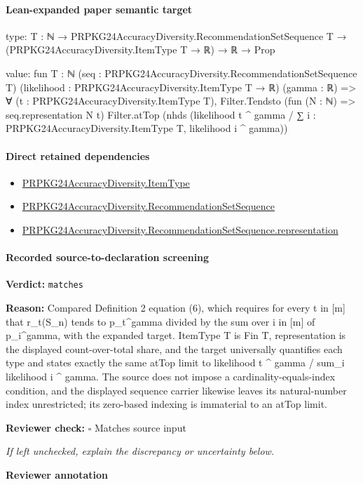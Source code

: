 \documentclass[10pt]{article}
\newcommand{\reviewerbox}{%
  \par\noindent\fbox{\parbox{0.96\linewidth}{\rule{0pt}{0.38in}}}\par
}
\newcommand{\reviewmatch}[1]{%
  \par\noindent\textbf{Reviewer check:} $\square$\; #1\par
  \noindent\emph{If left unchecked, explain the discrepancy or uncertainty below.}\par
}
\begin{document}
\paragraph{Lean-expanded paper semantic target}
\begin{ReviewVerbatim}
type:
{T : ℕ} → PRPKG24AccuracyDiversity.RecommendationSetSequence T → (PRPKG24AccuracyDiversity.ItemType T → ℝ) → ℝ → Prop

value:
fun {T : ℕ} (seq : PRPKG24AccuracyDiversity.RecommendationSetSequence T)
    (likelihood : PRPKG24AccuracyDiversity.ItemType T → ℝ) (gamma : ℝ) =>
  ∀ (t : PRPKG24AccuracyDiversity.ItemType T),
    Filter.Tendsto (fun (N : ℕ) => seq.representation N t) Filter.atTop
      (nhds (likelihood t ^ gamma / ∑ i : PRPKG24AccuracyDiversity.ItemType T, likelihood i ^ gamma))
\end{ReviewVerbatim}

\paragraph{Direct retained dependencies}
\begin{itemize}\raggedright
\item \hyperlink{governing-declaration-562ef32e180a12be}{PRPKG24\allowbreak{}Accuracy\allowbreak{}Diversity.\allowbreak{}Item\allowbreak{}Type}
\item \hyperlink{governing-declaration-971a317750580d7e}{PRPKG24\allowbreak{}Accuracy\allowbreak{}Diversity.\allowbreak{}Recommendation\allowbreak{}Set\allowbreak{}Sequence}
\item \hyperlink{governing-declaration-38b482fdc6810ec4}{PRPKG24\allowbreak{}Accuracy\allowbreak{}Diversity.\allowbreak{}Recommendation\allowbreak{}Set\allowbreak{}Sequence.\allowbreak{}representation}
\end{itemize}
\paragraph{Recorded source-to-declaration screening}
\textbf{Verdict:} \texttt{matches}
\\
{\raggedright
\textbf{Reason:} Compared Definition 2 equation (6), which requires for every t in [m] that r\_\allowbreak{}t(S\_\allowbreak{}n) tends to p\_\allowbreak{}t\textasciicircum{}gamma divided by the sum over i in [m] of p\_\allowbreak{}i\textasciicircum{}gamma, with the expanded target.\allowbreak{} ItemType T is Fin T, representation is the displayed count-\allowbreak{}over-\allowbreak{}total share, and the target universally quantifies each type and states exactly the same atTop limit to likelihood t \textasciicircum{} gamma /\allowbreak{} sum\_\allowbreak{}i likelihood i \textasciicircum{} gamma.\allowbreak{} The source does not impose a cardinality-\allowbreak{}equals-\allowbreak{}index condition, and the displayed sequence carrier likewise leaves its natural-\allowbreak{}number index unrestricted;\allowbreak{} its zero-\allowbreak{}based indexing is immaterial to an atTop limit.\allowbreak{}
\par}
\reviewmatch{Matches source input}
\noindent\textbf{Reviewer annotation}\par
\reviewerbox
\clearpage
\hypertarget{paper-prerequisite-62a80495e02812f6}{}
\end{document}
